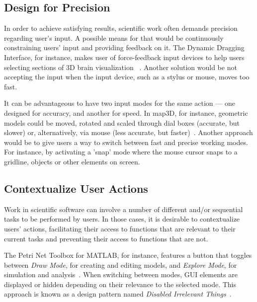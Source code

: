 \documentclass[conference]{IEEEtran}
\begin{document}
\subsection{Design for Precision}

In order to achieve satisfying results, scientific work often demands precision
regarding user's input. A possible means for that would be continuously 
constraining users' input and providing feedback on it. The Dynamic Dragging
Interface, for instance, makes user of force-feedback input devices to 
help users selecting sections of 3D brain visualization ~\cite{Keefe:2010}.
Another solution would be not accepting the input when 
the input device, such as a stylus or mouse, moves too fast. 

It can be advantageous to have two input modes for the same action ---
one designed for accuracy,
and another for speed. In map3D, for instance, geometric models could be moved, 
rotated and scaled through dial boxes (accurate, but slower) or, alternatively, 
via mouse (less accurate, but faster)~\cite{MacLeod:1992}. Another approach 
would be to give users a way to switch between fast and precise working modes.
For instance, by activating a 'snap' mode where the mouse cursor snaps to a gridline,
objects or other elements on screen. 


\subsection{Contextualize User Actions}
Work in scientific software can involve a number of different and/or sequential
tasks to be performed by users. In those cases, it is desirable to contextualize
users' actions, facilitating their access to functions that are relevant to their 
current tasks and preventing their access to functions that are not.

The Petri Net Toolbox for MATLAB, for instance, features a button that toggles 
between \emph{Draw Mode}, for creating and editing models, and \emph{Explore Mode},
for simulation and analysis~\cite{Julvez:2014}. When switching between modes, 
GUI elements are displayed or hidden depending on their relevance to the 
selected mode. This approach is known as a design pattern 
named  \emph{Disabled Irrelevant Things}~\cite{Zeeshan:2011}. 
\end{document}
